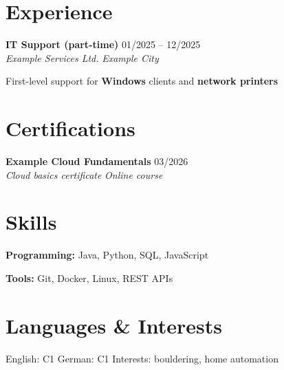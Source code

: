 \documentclass[10pt,a4paper]{article}
\let\olditemize\itemize
\let\endolditemize\enditemize
\renewenvironment{itemize}{\olditemize\RaggedRight}{\endolditemize\vspace{6pt}}
\newcommand{\cvheading}[4]{%
  \textbf{#1} \hfill #2\\
  \textit{#3} \hfill \textit{#4}\par
}
\newenvironment{cvblock}{\noindent\begin{minipage}{\linewidth}}{\end{minipage}}
\begin{document}
\section{Experience}
\begin{cvblock}
\cvheading{IT Support (part-time)}{01/2025 -- 12/2025}{Example Services Ltd.}{Example City}
\begin{itemize}
  \item First-level support for \textbf{Windows} clients and \textbf{network printers}
\end{itemize}
\end{cvblock}

\section{Certifications}
\begin{cvblock}
\cvheading{Example Cloud Fundamentals}{03/2026}{Cloud basics certificate}{Online course}
\vspace{6pt}
\end{cvblock}

\section{Skills}
\begin{cvblock}
\noindent
\begin{minipage}[t]{0.49\linewidth}
  \textbf{Programming:} Java, Python, SQL, JavaScript
\end{minipage}\hfill
\begin{minipage}[t]{0.49\linewidth}
  \textbf{Tools:} Git, Docker, Linux, REST APIs
\end{minipage}
\end{cvblock}

\section{Languages \& Interests}
\noindent English: C1 \quad German: C1 \quad Interests: bouldering, home automation
\end{document}
